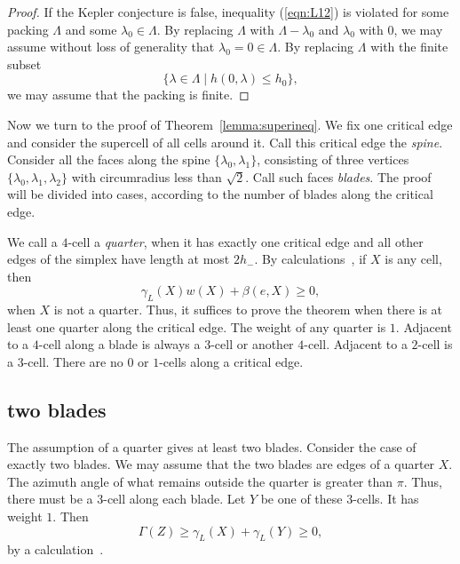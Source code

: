 \begin{proof} If the Kepler conjecture is false, inequality (\ref{eqn:L12}) is violated for some packing $\Lambda$ and some $\lambda_0\in\Lambda$.  By replacing $\Lambda$ with $\Lambda - \lambda_0$ and $\lambda_0$ with $0$, we may assume without loss of generality that $\lambda_0=0\in\Lambda$.  By replacing $\Lambda$ with the finite subset
$$
\{\lambda\in\Lambda\mid h(0,\lambda)\le h_0\},
$$
we may assume that the packing is finite.
\end{proof}


Now we turn to the proof of Theorem~\ref{lemma:superineq}. We fix one critical edge and consider the supercell of all cells around it.  Call this critical edge the {\it spine}.  Consider all the faces along the spine $\{\lambda_0,\lambda_1\}$, consisting of three vertices $\{\lambda_0,\lambda_1,\lambda_2\}$ with circumradius less than $\sqrt2$.  Call such faces {\it blades}.  The proof will be divided into cases, according to the number of blades along the critical edge.

We call a $4$-cell a {\it quarter}, when it has exactly one critical edge and all other edges of the simplex have length at most $2 h_-$. By calculations~\cite[cc:qtr:GLFVCVK]{hales:2009:nonlinear}, if $X$ is any cell, then %
$$
 \gamma_L(X) w(X) + \beta(e,X)\ge 0,
$$ 
when $X$ is not a quarter.  Thus, it
suffices to prove the theorem
when there is at least one quarter along the critical
edge.  The weight of any quarter is $1$.
Adjacent to a $4$-cell along a blade is always a $3$-cell or another $4$-cell. Adjacent to a $2$-cell is a $3$-cell.  There are no $0$ or $1$-cells along a critical edge.



\subsection{two blades}

The assumption of a quarter gives at least two blades.  Consider
the case of exactly two blades.
We may assume that the two blades are edges of a quarter
$X$. 
The azimuth angle of what remains outside the quarter
is greater than $\pi$.  Thus, there must be a $3$-cell
along each blade.  Let $Y$ be one of these $3$-cells.
It has weight $1$.
Then 
\begin{equation}\label{eqn:34}
\Gamma(Z)\ge \gamma_L(X)+\gamma_L(Y)\ge 0,
\end{equation}
by a calculation~\cite[cc:2bl:FHBVYXZ]{hales:2009:nonlinear}. %




